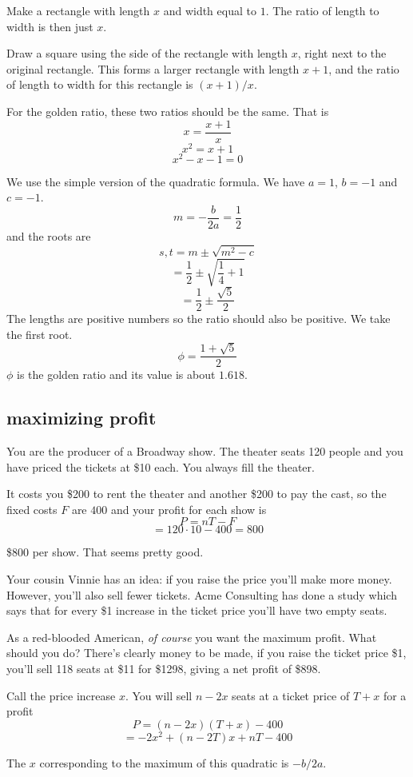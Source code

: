\documentclass[11pt, oneside]{article}
\begin{document}
Make a rectangle with length $x$ and width equal to $1$.  The ratio of length to width is then just $x$.

Draw a square using the side of the rectangle with length $x$, right next to the original rectangle.  This forms a larger rectangle with length $x + 1$, and the ratio of length to width for this rectangle is $(x+1)/x$.

For the golden ratio, these two ratios should be the same.  That is
\[ x = \frac{x + 1}{x} \]
\[ x^2 = x + 1 \]
\[ x^2 - x - 1 = 0 \]

We use the simple version of the quadratic formula.  We have $a = 1$, $b = -1$ and $c = - 1$.
\[ m = - \frac{b}{2a} = \frac{1}{2} \]
and the roots are
\[ s,t = m \pm \sqrt{m^2 - c} \]
\[ = \frac{1}{2} \pm \sqrt{\frac{1}{4} + 1} \]
\[ = \frac{1}{2} \pm \frac{\sqrt{5}}{2} \]
The lengths are positive numbers so the ratio should also be positive.  We take the first root.
\[ \phi = \frac{1 + \sqrt{5}}{2}  \]
$\phi$ is the golden ratio and its value is about $1.618$.

\subsection*{maximizing profit}
You are the producer of a Broadway show.  The theater seats 120 people and you have priced the tickets at \$10 each.  You always fill the theater.

It costs you \$200 to rent the theater and another \$200 to pay the cast, so the fixed costs $F$ are $400$ and your profit for each show is
\[ P = nT - F \]
\[ = 120 \cdot 10 - 400 = 800 \]

\$800 per show.  That seems pretty good.

Your cousin Vinnie has an idea:  if you raise the price you'll make more money.  However, you'll also sell fewer tickets.  Acme Consulting has done a study which says that for every \$1 increase in the ticket price you'll have two empty seats.

As a red-blooded American, \emph{of course} you want the maximum profit.  What should you do?  There's clearly money to be made, if you raise the ticket price \$1, you'll sell 118 seats at \$11 for \$1298, giving a net profit of \$898.

Call the price increase $x$.  You will sell $n - 2x$ seats at a ticket price of $T + x$ for a profit
\[ P = (n - 2x)(T + x) - 400 \]
\[ = -2x^2 + (n - 2T)x + nT - 400 \]

The $x$ corresponding to the maximum of this quadratic is $-b/2a$.
\end{document}
